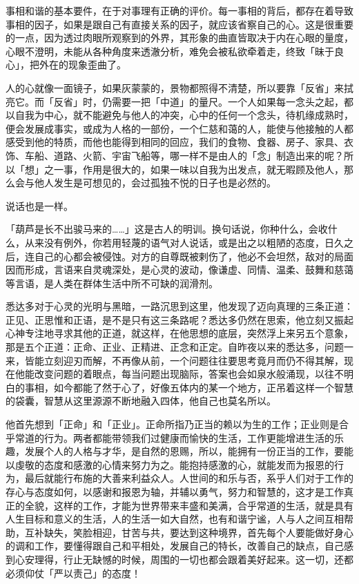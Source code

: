 \documentclass[twoside,openany]{book}
\begin{document}
事相和谐的基本要件，在于对事理有正确的评价。每一事相的背后，都存在着导致事相的因子，如果是跟自己有直接关系的因子，就应该省察自己的心。这是很重要的一点，因为透过肉眼所观察到的外界，其形象的曲直皆取决于内在心眼的量度，心眼不澄明，未能从各种角度来透澈分析，难免会被私欲牵着走，终致「昧于良心」，把外在的现象歪曲了。

人的心就像一面镜子，如果灰蒙蒙的，景物都照得不清楚，所以要靠「反省」来拭亮它。而「反省」时，仍需要一把「中道」的量尺。一个人如果每一念头之起，都以自我为中心，就不能避免与他人的冲突，心中的任何一个念头，待机缘成熟时，便会发展成事实，或成为人格的一部份，一个仁慈和蔼的人，能使与他接触的人都感受到他的特质，而他也能得到相同的回应，我们的食物、食器、房子、家具、衣饰、车船、道路、火箭、宇宙飞船等，哪一样不是由人的「念」制造出来的呢？所以「想」之一事，作用是很大的，如果一味以自我为出发点，就无暇顾及他人，那么会与他人发生是可想见的，会过孤独不悦的日子也是必然的。

说话也是一样。

「葫芦是长不出骏马来的……」这是古人的明训。换句话说，你种什么，会收什么，从来没有例外，你若用轻蔑的语气对人说话，或是出之以粗陋的态度，日久之后，连自己的心都会被侵蚀。对方的自尊既被剌伤了，他必不会坦然，敌对的局面因而形成，言语来自灵魂深处，是心灵的波动，像谦虚、同情、温柔、鼓舞和慈蔼等言语，是人类在群体生活中所不可缺的润滑剂。

悉达多对于心灵的光明与黑暗，一路沉思到这里，他发现了迈向真理的三条正道：正见、正思惟和正语，是不是只有这三条路呢？悉达多仍然在思索，他立刻又振起心神专注地寻求其他的正道，就这样，在他思想的底层，突然浮上来另五个意象，那是五个正道：正命、正业、正精进、正念和正定。自昨夜以来的悉达多，问题一来，皆能立刻迎刃而解，不再像从前，一个问题往往要思考竟月而仍不得其解，现在他能改变问题的着眼点，每当问题出现脑际，答案也会如泉水般涌现，以往不明白的事相，如今都能了然于心了，好像五体内的某一个地方，正吊着这样一个智慧的袋囊，智慧从这里源源不断地融入四体，他自己也莫名所以。

他首先想到「正命」和「正业」。正命所指乃正当的赖以为生的工作；正业则是合乎常道的行为。两者都能带领我们过健康而愉快的生活，工作更能增进生活的乐趣，发展个人的人格与才华，是自然的恩赐，所以，能拥有一份正当的工作，要能以虔敬的态度和感激的心情来努力为之。能抱持感激的心，就能发而为报恩的行为，最后就能行布施的大善来利益众人。人世间的和乐与否，系乎人们对于工作的存心与态度如何，以感谢和报恩为轴，并辅以勇气，努力和智慧的，这才是工作真正的全貌，这样的工作，才能为世界带来丰盛和美满，合乎常道的生活，就是具有人生目标和意义的生活，人的生活一如大自然，也有和谐宁谧，人与人之间互相帮助，互补缺失，笑脸相迎，甘苦与共，要达到这种境界，首先每个人要能做好身心的调和工作，要懂得跟自己和平相处，发展自己的特长，改善自己的缺点，自己感到心安理得，行止无缺憾的时候，周围的一切也都会跟着美好起来。这一切，还都必须仰仗「严以责己」的态度！
\end{document}
